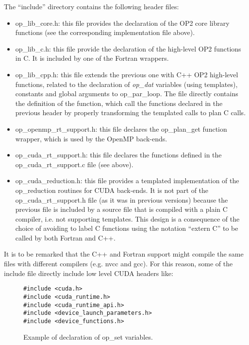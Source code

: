 \documentclass[a4paper]{article}
\newcommand{\opdat}{{\em op\_dat }}
\newcommand{\oploopN}{op\_par\_loop} %
\begin{document}
The ``include'' directory contains the following header files:

\begin{itemize}

\item op\_lib\_core.h: this file provides the declaration of the OP2
  core library functions (see the corresponding implementation file
  above).

\item op\_lib\_c.h: this file provide the declaration of the
  high-level OP2 functions in C. It is included by one of the Fortran
  wrappers.

\item op\_lib\_cpp.h: this file extends the previous one with C++ OP2
  high-level functions, related to the declaration of \opdat variables
  (using templates), constants and global arguments to \oploopN.
  The file directly contains the definition of the function, which
  call the functions declared in the previous header by properly
  transforming the templated calls to plan C calls.

\item op\_openmp\_rt\_support.h: this file declares the op\_plan\_get
  function wrapper, which is used by the OpenMP back-ends.

\item op\_cuda\_rt\_support.h: this file declares the functions
  defined in the op\_cuda\_rt\_support.c file (see above).

\item op\_cuda\_reduction.h: this file provides a templated
  implementation of the op\_reduction routines for CUDA back-ends. It
  is not part of the op\_cuda\_rt\_support.h file (as it was in
  previous versions) because the previous file is included by a source
  file that is compiled with a plain C compiler, i.e. not supporting
  templates. This design is a consequence of the choice of avoiding to
  label C functions using the notation ``extern C'' to be called by
  both Fortran and C++.

\end{itemize}

It is to be remarked that the C++ and Fortran support might compile
the same files with different compilers (e.g. nvcc and gcc). For this
reason, some of the include file directly include low level CUDA
headers like:

\begin{figure}[h!]
 \centering
\begin{lstlisting}
#include <cuda.h>
#include <cuda_runtime.h>
#include <cuda_runtime_api.h>
#include <device_launch_parameters.h>
#include <device_functions.h>
\end{lstlisting}
\caption{Example of declaration of op\_set variables.}
 \label{fig:op-set-example}
\end{figure}
\end{document}
